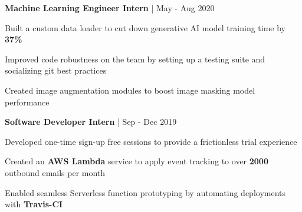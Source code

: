 \begin{cventries}

\cventry
{\textbf{Machine Learning Engineer Intern} | \color{awesome}{PerkinElmer}}
{May - Aug 2020} %
{ %
\begin{cvitems}
\item {Built a custom data loader to cut down generative AI model training time by \textbf{37\%}}
\item {Improved code robustness on the team by setting up a testing suite and socializing git best practices}
\item {Created image augmentation modules to boost image masking model performance}
\end{cvitems}
}


\cventry
{\textbf{Software Developer Intern} | \color{awesome}{ROSS Intelligence}}
{Sep - Dec 2019} %
{ %
\begin{cvitems}
\item {Developed one-time sign-up free sessions to provide a frictionless trial experience}
\item {Created an \textbf{AWS Lambda} service to apply event tracking to over \textbf{2000} outbound emails per month}
\item {Enabled seamless Serverless function prototyping by automating deployments with \textbf{Travis-CI}}
\end{cvitems}
}




\end{cventries}
